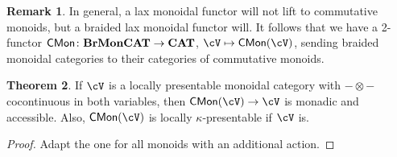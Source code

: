 \documentclass[a4paper,11pt,oneside,openany]{scrbook}
\newcommand{\catname}[1]{{\normalfont\textbf{#1}}}
\newcommand{\CAT}{\catname{CAT}}
\DeclareMathOperator{\CMon}{\mathsf{CMon}}
\theoremstyle{definition}
\newtheorem{thm}{Theorem}[section] %
\theoremstyle{definition}
\newtheorem{rmk}[thm]{Remark}
\begin{document}
\begin{rmk}
    In general, a lax monoidal functor will not lift to commutative monoids, but a braided lax monoidal functor will. It follows that we have a 2-functor $\CMon\colon\textbf{BrMonCAT}\rightarrow\CAT$, $\cV\mapsto\CMon(\cV)$, sending braided monoidal categories to their categories of commutative monoids.
\end{rmk}

\begin{thm}
    If $\cV$ is a locally presentable monoidal category with $-\otimes -$ cocontinuous in both variables, then $\CMon(\cV)\rightarrow\cV$ is monadic and accessible. Also, $\CMon(\cV)$ is locally $\kappa$-presentable if $\cV$ is.
\end{thm}

\begin{proof}
    Adapt the one for all monoids with an additional action.
\end{proof}
\end{document}
